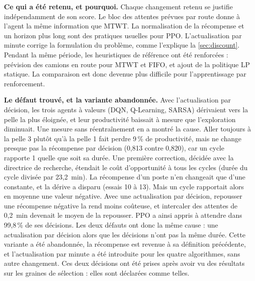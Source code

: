 \documentclass[11pt,a4paper]{article}
\newif\ifrevmarks
\newcommand{\revtag}[1]{\ifrevmarks\textsuperscript{\textcolor{red!70!black}{\scriptsize[#1]}}\fi}
\newenvironment{revbloc}[1]{\par\ifrevmarks\color{revcolor}\noindent\revtag{#1}\ \fi}{\par}
\newif\ifcorrmarks
\newcommand{\corr}[1]{\ifcorrmarks\textcolor{corrcolor}{#1}\else#1\fi}
\begin{document}
\begin{revbloc}{v3}
\textbf{Ce qui a été retenu, et pourquoi.} Chaque changement retenu se justifie indépendamment de son score. Le bloc des attentes prévues par route donne à l'agent la même information que MTWT. La normalisation de la récompense et un horizon plus long sont des pratiques usuelles pour PPO. L'actualisation par minute corrige la formulation du problème, comme l'explique la \cref{sec:discount}. Pendant la même période, les heuristiques de référence ont été renforcées : prévision des camions en route pour MTWT et FIFO, et ajout de la politique \corr{LP statique}. La comparaison est donc devenue plus difficile pour l'apprentissage par renforcement.

\textbf{Le défaut trouvé, et la variante abandonnée.} Avec l'actualisation par décision, les trois agents à valeurs (DQN, Q-Learning, SARSA) dérivaient vers la pelle la plus éloignée, et leur productivité baissait à mesure que l'exploration diminuait. Une mesure sans réentraînement en a montré la cause. Aller toujours à la pelle 3 plutôt qu'à la pelle 1 fait perdre 9\,\% de productivité, mais ne change presque pas la récompense par décision (0,813 contre 0,820), car un cycle rapporte 1 quelle que soit sa durée. Une première correction, décidée avec la directrice de recherche, étendait le coût d'opportunité à tous les cycles (durée du cycle divisée par 23,2~min). La récompense d'un poste n'en changeait que d'une constante, et la dérive a disparu (essais 10 à 13). Mais un cycle rapportait alors en moyenne une valeur négative. Avec une actualisation par décision, repousser une récompense négative la rend moins coûteuse, et intercaler des attentes de 0,2~min devenait le moyen de la repousser. PPO a ainsi appris à attendre dans 99,8\,\% de ses décisions. Les deux défauts ont donc la même cause : une actualisation par décision alors que les décisions n'ont pas la même durée. Cette variante a été abandonnée, la récompense est revenue à sa définition précédente, et l'actualisation par minute a été introduite pour les quatre algorithmes, sans autre changement. Ces deux décisions ont été prises après avoir vu des résultats sur les graines de sélection : elles sont déclarées comme telles.


\end{revbloc}
\end{document}
